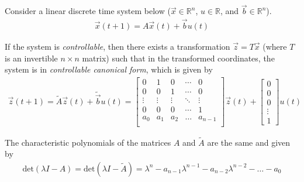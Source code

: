 


Consider a linear discrete time system below ($\vec{x} \in
\mathbb{R}^n$, $u \in \mathbb{R}$, and $\vec{b} \in \mathbb{R}^n$).
\begin{align*}
\vec{x}(t+1) = A \vec{x}(t) + \vec{b} u(t)
\end{align*}

If the system is \textit{controllable},
then there exists a transformation $\vec{z} = T\vec{x}$ (where $T$ is an invertible $n\times n$ matrix)
such that in the transformed coordinates, the system is in
\textit{controllable canonical form}, which is given by
\begin{align*}
\vec{z}(t+1) = \widetilde{A}\vec{z}(t) + \widetilde{\vec{b}} u(t) = \begin{bmatrix}
0 & 1 & 0 & \cdots & 0 \\
0 & 0 & 1 & \cdots & 0 \\
\vdots & \vdots & \vdots  & \ddots & \vdots \\
 0 & 0 & 0 & \cdots & 1 \\
 a_0 & a_{1} & a_{2} & \ldots & a_{n-1} \\
\end{bmatrix} 
\vec{z}(t) +
\begin{bmatrix}
0 \\ 0 \\ 0 \\ \vdots \\ 1
\end{bmatrix}
u(t)
\end{align*}

The characteristic polynomials of the matrices $A$ and $\widetilde{A}$ are the same and given by
\begin{align}\label{eq:poly}
\mbox{det}(\lambda I - A ) = \mbox{det}(\lambda I - \widetilde{A} )
= \lambda^n  - a_{n-1} \lambda^{n-1} - a_{n-2} \lambda^{n-2} - \ldots - a_0
\end{align}

